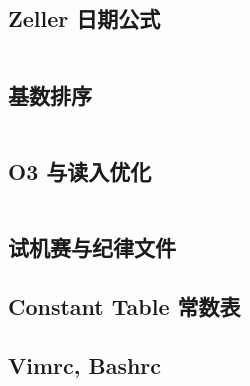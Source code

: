 \documentclass[titlepage, a4paper]{article}
\begin{document}
\begin{multicols}{2}
\begin{spacing}{0.6}
				\subsection{Zeller 日期公式}
					\inputminted{cpp}{src/Miscellany/日期公式.cpp}
				\subsection{基数排序}
					\inputminted{cpp}{src/Miscellany/RadixSort.cpp}
				\subsection{O3 与读入优化}
					\inputminted{cpp}{src/Miscellany/hack.cpp}
				\subsection{试机赛与纪律文件}
				\begin{spacing}{0.5}
					
				\end{spacing}
				\subsection{Constant Table 常数表}
				\label{randomprimes}
				\begin{small}
					\setlength{\parindent}{0em}\setlength{\parskip}{0em}\renewcommand{\baselinestretch}{.8}
					\texttt{}
				\end{small}
				
				\subsection*{Vimrc, Bashrc}
				\inputminted{vim}{src/Miscellany/vimrc}
				\inputminted{sh}{src/Miscellany/bashrc}
					

\end{spacing}
\end{multicols}
\end{document}
